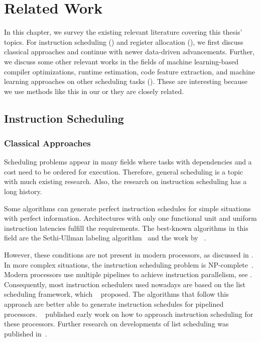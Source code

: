 \chapter{Related Work}
\label{sec:rw}
In this chapter, we survey the existing relevant literature covering this thesis' topics. 
For instruction scheduling () and register allocation (), we first discuss classical approaches and continue with newer data-driven advancements.
Further, we discuss some other relevant works in the fields of machine learning-based compiler optimizations, runtime estimation, code feature extraction, and machine learning approaches on other scheduling tasks ().
These are interesting because we use methods like this in our or they are closely related.

\section{Instruction Scheduling}
\label{sec:rw:instruction-scheduling}
\subsection{Classical Approaches}
Scheduling problems appear in many fields where tasks with dependencies and a cost need to be ordered for execution.
Therefore, general scheduling is a topic with much existing research.
Also, the research on instruction scheduling has a long history.

Some algorithms can generate perfect instruction schedules for simple situations with perfect information.
Architectures with only one functional unit and uniform instruction latencies fulfill the requirements.
The best-known algorithms in this field are the Sethi-Ullman labeling algorithm~\cite{sethi1970generation} and the work by \citeauthor{proebsting1991linear}~\cite{proebsting1991linear}.

However, these conditions are not present in modern processors, as discussed in .
In more complex situations, the instruction scheduling problem is NP-complete~\cite{hennessy1983postpass}.
Modern processors use multiple pipelines to achieve instruction parallelism, see .
Consequently, most instruction schedulers used nowadays are based on the list scheduling framework, which \citeauthor{landskov1980local}~\cite{landskov1980local} proposed.
The algorithms that follow this approach are better able to generate instruction schedules for pipelined processors.
\citeauthor{heller1961sequencing}~\cite{heller1961sequencing} published early work on how to approach instruction scheduling for these processors.
Further research on developments of list scheduling was published in~\cite{bernstein1991global,gibbons1986efficient,hennessy1983postpass}.

